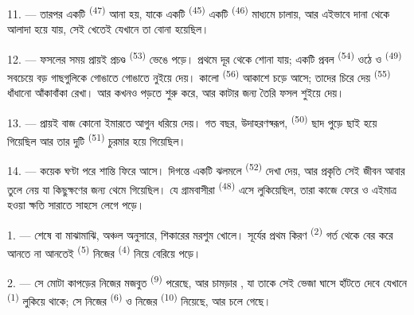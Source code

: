 11. --- তারপর একটি  \textsuperscript{(47)} আনা হয়,
যাকে একটি  \textsuperscript{(45)} একটি 
\textsuperscript{(46)} মাধ্যমে চালায়, আর এইভাবে দানা  থেকে আলাদা হয়ে
যায়, সেই খেতেই যেখানে তা বোনা হয়েছিল।

\VUsaut{5.0mm}
\VUsaut{3.4mm}

12. --- ফসলের সময় প্রায়ই প্রচণ্ড  \textsuperscript{(53)} ভেঙে পড়ে।
প্রথমে দূর থেকে  শোনা যায়; একটি প্রবল  \textsuperscript{(54)} ওঠে ও  \textsuperscript{(49)} সবচেয়ে
বড় গাছগুলিকে গোঙাতে গোঙাতে নুইয়ে দেয়। কালো 
\textsuperscript{(56)} আকাশে চড়ে আসে; তাদের চিরে দেয় 
\textsuperscript{(55)} ধাঁধানো আঁকাবাঁকা রেখা।  আর কখনও
 পড়তে শুরু করে, আর কাটার জন্য তৈরি ফসল শুইয়ে দেয়।

13. --- প্রায়ই বাজ কোনো ইমারতে আগুন ধরিয়ে দেয়। গত বছর, উদাহরণস্বরূপ,
 \textsuperscript{(50)} ছাদ পুড়ে ছাই হয়ে গিয়েছিল আর তার
দুটি  \textsuperscript{(51)} চুরমার হয়ে গিয়েছিল।

14. --- কয়েক ঘণ্টা পরে শান্তি ফিরে আসে। দিগন্তে একটি ঝলমলে 
\textsuperscript{(52)} দেখা দেয়, আর প্রকৃতি সেই জীবন আবার তুলে নেয় যা কিছুক্ষণের
জন্য থেমে গিয়েছিল। যে গ্রামবাসীরা  \textsuperscript{(48)}
এসে লুকিয়েছিল, তারা কাজে ফেরে ও এইমাত্র হওয়া ক্ষতি সারাতে সাহসে লেগে
পড়ে।

\VUsaut{6.0mm}
\VUsaut{3.6mm}

\VUsaut{1.4mm}
\VUsaut{4.0mm}

1. ---  শেষে বা  মাঝামাঝি, অঞ্চল অনুসারে,
শিকারের মরশুম খোলে। সূর্যের প্রথম কিরণ 
\textsuperscript{(2)} গর্ত থেকে বের করে আনতে না আনতেই 
\textsuperscript{(5)} নিজের  \textsuperscript{(4)} নিয়ে বেরিয়ে
পড়ে।

2. --- সে মোটা কাপড়ের নিজের মজবুত  \textsuperscript{(9)}
পরেছে, আর চামড়ার , যা তাকে সেই ভেজা ঘাসে হাঁটতে দেবে যেখানে
 \textsuperscript{(1)} লুকিয়ে থাকে; সে নিজের 
\textsuperscript{(6)} ও নিজের  \textsuperscript{(10)} নিয়েছে,
আর চলে গেছে।


